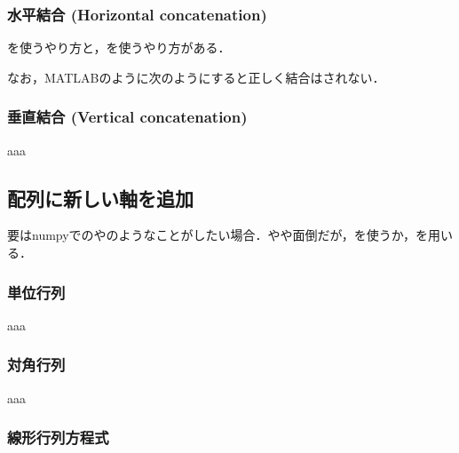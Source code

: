 \subsubsection{水平結合 (Horizontal concatenation)}
を使うやり方と，\jl{[ ]}を使うやり方がある．


なお，MATLABのように次のようにすると正しく結合はされない．

\subsubsection{垂直結合 (Vertical concatenation)}

aaa



\subsection{配列に新しい軸を追加}
要はnumpyでのやのようなことがしたい場合．やや面倒だが，を使うか，\jl{[CartesianIndex()]}を用いる．


\subsubsection{単位行列}

aaa


\subsubsection{対角行列}

aaa
\subsubsection{線形行列方程式}

